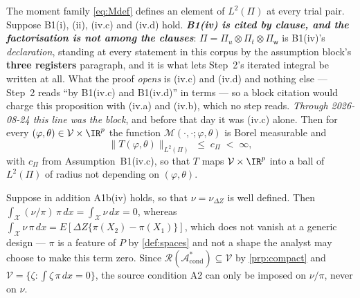 \begin{proposition}\label{prp:wellposed}
The moment family \eqref{eq:Mdef} defines an element of $L^{2}(\Pi)$ at every trial pair.
Suppose B1(i), (ii), (iv.c) and (iv.d) hold. \emph{\textbf{B1(iv) is cited by clause, and the
factorisation is not among the clauses}}: $\Pi=\Pi_u\otimes\Pi_t\otimes\Pi_{\mathsf w}$ is B1(iv)'s
\emph{declaration}, standing at every statement in this corpus by the assumption block's \textbf{three
registers} paragraph, and it is what lets Step~2's iterated integral be written at all. What the proof
\emph{opens} is \textup{(iv.c)} and \textup{(iv.d)} and nothing else --- Step~2 reads ``by B1(iv.c) and
B1(iv.d)'' in terms --- so a block citation would charge this proposition with \textup{(iv.a)} and
\textup{(iv.b)}, which no step reads. \emph{Through 2026-08-24 this line was the block}, and before that
day it was \textup{(iv.c)} alone. Then for every $(\varphi,\theta)\in\mathcal V\times\IR^{p}$ the function
$\mathcal M(\cdot,\cdot;\varphi,\theta)$ is Borel measurable and
\[
\big\|T(\varphi,\theta)\big\|_{L^{2}(\Pi)}\;\le\;c_\Pi\;<\;\infty ,
\]
with $c_\Pi$ from Assumption~B1(iv.c), so that $T$ maps $\mathcal V\times\IR^{p}$ into a
ball of $L^{2}(\Pi)$ of radius not depending on $(\varphi,\theta)$.
\end{proposition}

\begin{remark}[$\nu$ versus $\nu/\pi$]\label{rem:nupi}
Suppose in addition A1b(iv) holds, so that $\nu=\nu_{\Delta Z}$ is well defined. Then
$\int_{\mathcal X}(\nu/\pi)\,\pi\,dx=\int_{\mathcal X}\nu\,dx=0$, whereas
$\int_{\mathcal X}\nu\,\pi\,dx=E[\Delta Z\{\pi(X_2)-\pi(X_1)\}]$, which does not vanish at a generic
design --- $\pi$ is a feature of $P$ by \cref{def:spaces} and not a shape the analyst may choose to make
this term zero. Since $\mathcal R(\mathcal A^\ast_{\mathrm{cond}})\subseteq\mathcal V$ by
\cref{prp:compact} and $\mathcal V=\{\zeta:\int\zeta\,\pi\,dx=0\}$, the source condition A2 can only be
imposed on $\nu/\pi$, never on $\nu$.
\end{remark}


